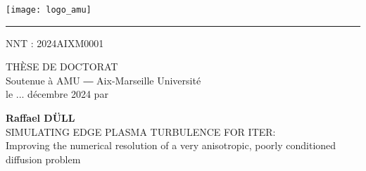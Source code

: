 \chead{}
\thispagestyle{empty}

\vspace{1em}

\begin{center}
	\begin{minipage}[c]{.5\linewidth}
		\raggedright\texttt{[image: logo\_amu]}
	\end{minipage}\hfill
	\begin{minipage}[c]{.5\linewidth}
	\end{minipage}\hfill
\end{center}


\begin{center}
	\begin{minipage}[c]{.77\linewidth}
		\textcolor{yellowamu}{\noindent\rule{\textwidth}{4pt}}
	\end{minipage}\hfill
	\begin{minipage}[c]{.23\linewidth}
		\raggedleft\textsf{NNT : 2024AIXM0001}
	\end{minipage}\hfill
\end{center}


\doublespacing
\begin{flushleft}
    \textsf{\HUGE\textcolor{blueamu}{THÈSE DE DOCTORAT}}\\
	\textsf{\Large Soutenue à AMU ― Aix-Marseille Université}\\
	\textsf{\Large le ... décembre 2024 par}\\
\end{flushleft}
\vspace{1.5em}
\begin{center}
	\textsf{\textbf{\Huge Raffael DÜLL}}\\
    \vspace{1em}
	\textsf{\LARGE SIMULATING EDGE PLASMA TURBULENCE FOR ITER:}\\ 
	\textsf{\Large Improving the numerical resolution of a very anisotropic, poorly conditioned diffusion problem}\\
\end{center}
\singlespacing

